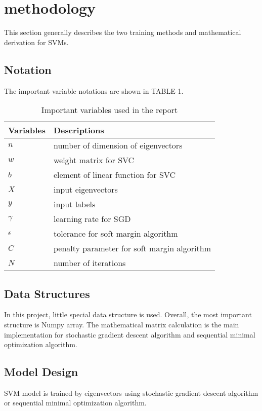 \documentclass[journal,twoside,web]{ieeecolor}
\begin{document}
\section{methodology}
This section generally describes the two training methods and mathematical derivation for SVMs.
\subsection{Notation}
The important variable notations are shown in TABLE 1.
\begin{table}[]
\centering
\caption{Important variables used in the report}
\label{tab:var}
\begin{tabular}{ll}
\multicolumn{1}{c}{Variables} & Descriptions                                             \\ \hline
$n$                           & number of dimension of eigenvectors \\
$w$ 					      & weight matrix for SVC\\
$b$ 					      & element of linear function for SVC \\
$X$							  & input eigenvectors  \\
$y$							  & input labels  \\
$\gamma$                      & learning rate for SGD             \\
$\epsilon$					  & tolerance for soft margin algorithm\\
$C$							  & penalty parameter for soft margin algorithm\\
$N$                           & number of iterations             
\end{tabular}
\end{table}


\subsection{Data Structures}
In this project, little special data structure is used. Overall, the most important structure is Numpy array. The mathematical matrix calculation is the main implementation for stochastic gradient descent algorithm and sequential minimal optimization algorithm.

\subsection{Model Design}
SVM model is trained by eigenvectors using stochastic gradient descent algorithm or sequential minimal optimization algorithm. 
\end{document}
